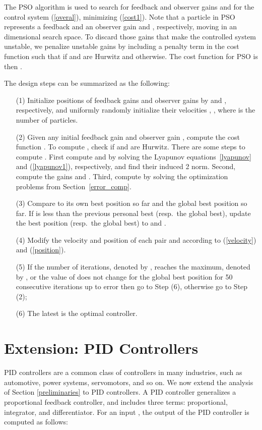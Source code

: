 \documentclass{amsart}
\numberwithin{equation}{section}
\begin{document}
The PSO algorithm is used to search for feedback and observer gains  and  
for the control system (\ref{overal}), minimizing (\ref{cost1}). 
Note that a particle in PSO represents a feedback and an observer gain  and , respectively, moving in an  dimensional search space. 
To discard those gains that make the controlled system unstable, we penalize unstable gains by including a penalty term  in the cost function
such that  if  and  are Hurwitz and  otherwise. 
The cost function for PSO is then .

The design steps can be summarized as the following:
\begin{itemize}
\item[(1)] Initialize positions of  feedback gains  and observer gains  by  and , respectively, and uniformly randomly initialize their velocities , , where  is the number of particles.
\item[(2)] Given any initial feedback gain  and observer gain , compute the cost function .
To compute , check if  and  are Hurwitz.
There are some steps to compute .
First compute  and  by solving the Lyapunov equations~\eqref{lyapunov} and (\ref{lyapunov1}), respectively, and find their induced 2 norm.
Second, compute the  gains  and . Third, compute  by solving the optimization problems from Section~\ref{error_comp}.
\item[(3)] Compare  to its own best position  so far and the global best position  so far.
If  is less than the previous personal best (resp.\ the global best), update the best position (resp.\ the global best) to  and .
\item[(4)] Modify the velocity and position of each pair  and  according to (\ref{velocity}) and (\ref{position}).
\item[(5)] If the number of iterations, denoted by , reaches the maximum, denoted by , or the value of  does not change for the global best position  for 50 consecutive iterations up to error  then go to Step (6), otherwise go to Step (2);
\item[(6)] The latest  is the optimal controller.
\end{itemize}

\section{Extension: PID Controllers}\label{PID}

PID controllers are a common class of controllers in many industries, such as automotive, power systems, servomotors, and so on. 
We now extend the analysis of Section \ref{preliminaries} to PID controllers. 
A PID controller generalizes a proportional feedback controller, and includes three terms: proportional, integrator, and differentiator. 
For an input , the output  of the PID controller is computed as follows:
   
\end{document}
